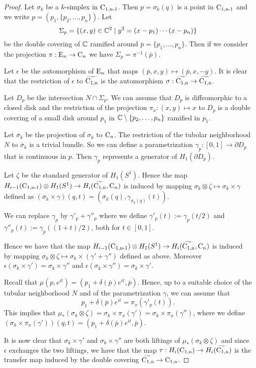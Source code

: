 \begin{proof}

Let $\sigma_k$ be a $k$-simplex in $\operatorname{C_{1,n-1}}$. Then $p = \sigma_k(q)$ is a point in $\operatorname{C_{1,n-1}}$ and we write $p= (p_1, \{p_2, \ldots, p_n\})$. Let 
$$
\Sigma_p = \{(x,y) \in {\mathbb{C}}^2 \mid y^2 = (x-p_1)\cdots(x-p_n)\}
$$ be the double covering of ${\mathbb{C}}$ ramified around $\overline{p} = \{p_1, \ldots, p_n\}$. Then if we consider the projection $\pi: \mathrm{E}_n \to \operatorname{C}_n$ we have $\Sigma_p = \pi^{-1} (\overline{p})$.

Let $\epsilon$ be the automorphism of $\mathrm{E}_n$ that maps $( \overline{p}, x,y) \mapsto (\overline{p},x,-y)$. It is clear that the restriction of $\epsilon$ to $\widetilde{\operatorname{C_{1,n}}}$ is the automorphism $\sigma: \widetilde{\operatorname{C_{1,n}}} \to \widetilde{\operatorname{C_{1,n}}}$.

Let $D_p$ be the intersection $N \cap \Sigma_p$. We can assume that $D_p$ is diffeomorphic to a closed disk and the restriction of the projection $\pi_x: (x, y) \mapsto x$ to $D_p$ is a double covering of a small disk around $p_1$ in ${\mathbb{C}} \setminus \{p_2, \ldots, p_n\}$ ramified in $p_1$.

Let $\overline{\sigma}_k$ be the projection of $\sigma_k$ to $\operatorname{C}_n$. The restriction of the tubolar neighborhood $N$ to $\overline{\sigma}_k$ is a trivial bundle. So we can define a parametrization $\gamma_p:[0,1]\to \partial D_p$ that is continuous in $p$. Then $\gamma_p$ represents a generator of $H_1(\partial D_p)$.

Let $\zeta$ be the standard generator of $H_1(S^1)$.
Hence the map $H_{i-1}(\operatorname{C_{1,n-1}}) \otimes H_1(S^1) \to H_i(\widetilde{\operatorname{C_{1,n}}}, \operatorname{C}_n) $ is induced by mapping 
$\sigma_k \otimes \zeta \mapsto  \sigma_k \times \gamma $ defined as  $(\sigma_k \times \gamma) (q, t) = ( \overline{\sigma}_k(q), \gamma_{\sigma_k(q)}(t))$.

We can replace $\gamma_p$ by $\gamma'_p + \gamma''_p$ where we define $\gamma'_p (t) := \gamma_p(t/2)$ and $\gamma''_p(t) := \gamma_p((1+t)/2)$, both for $t \in [0,1]$. 

Hence we have that the map $H_{i-1}(\operatorname{C_{1,n-1}}) \otimes H_1(S^1) \to H_i(\widetilde{\operatorname{C_{1,n}}}, \operatorname{C}_n) $ is induced by mapping 
$\sigma_k\otimes \zeta \mapsto  \sigma_k \times (\gamma' + \gamma'')$ defined as above. Moreover $\epsilon(\sigma_k \times \gamma') = \sigma_k \times \gamma''$ and $\epsilon(\sigma_k \times \gamma'') = \sigma_k \times \gamma'$.

Recall that $\mu(p,e^{it}) =  (p_1 + \delta(\overline{p})e^{it}, \overline{p})$. Hence, up to a suitable choice of  the tubular neighborhood $N$ and of the parametrization $\gamma$, we can assume that
$$
p_1 + \delta(\overline{p})e^{it} = \pi_x(\gamma'_{p}(t)).
$$
This implies that $\mu_*(\sigma_k\otimes \zeta) = \sigma_k \times \pi_x(\gamma')= \sigma_k \times \pi_x(\gamma'')$, where we define $ (\sigma_k \times \pi_x(\gamma'))(q,t) = (p_1 + \delta(\overline{p})e^{it},\overline{p})$.

It is now clear that $\sigma_k \times \gamma'$ and $\sigma_k \times \gamma''$ are both liftings of $\mu_*(\sigma_k\otimes \zeta)$ and since $\epsilon$ exchanges the two liftings, we have that 
the map $\tau: H_i(\operatorname{C_{1,n}}) \to H_i(\widetilde{\operatorname{C_{1,n}}})$ is the transfer map induced by the double covering $\widetilde{\operatorname{C_{1,n}}} \to \operatorname{C_{1,n}}$.
\end{proof}
